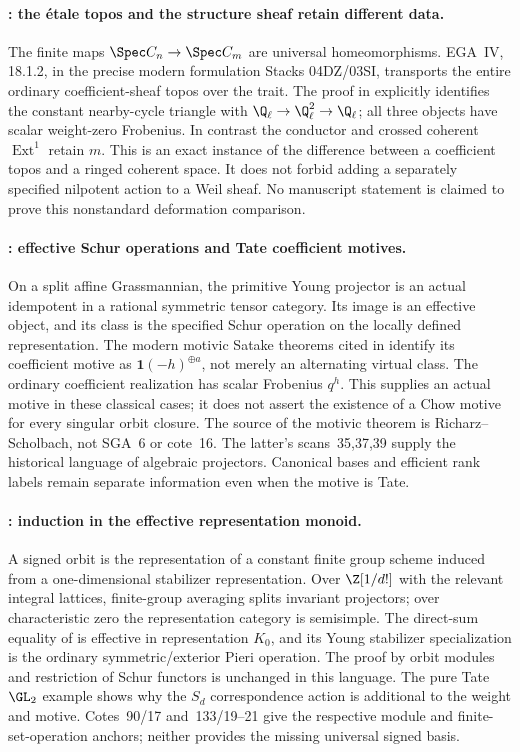 \paragraph{: the \'etale topos and the structure sheaf retain different data.}
The finite maps $\Spec C_n\to\Spec C_m$ are universal
homeomorphisms. EGA~IV, 18.1.2, in the precise modern formulation
Stacks 04DZ/03SI, transports the entire ordinary coefficient-sheaf
topos over the trait. The proof in  explicitly identifies
the constant nearby-cycle triangle with
$\Q_\ell\to\Q_\ell^2\to\Q_\ell$; all three objects have scalar
weight-zero Frobenius. In contrast the conductor and crossed coherent
$\operatorname{Ext}^1$ retain $m$. This is an exact instance of the
difference between a coefficient topos and a ringed coherent space.
It does not forbid adding a separately specified nilpotent action to
a Weil sheaf. No manuscript statement is claimed to prove this
nonstandard deformation comparison.

\paragraph{: effective Schur operations and Tate coefficient motives.}
On a split affine Grassmannian, the primitive Young projector is an
actual idempotent in a rational symmetric tensor category. Its image
is an effective object, and its class is the specified Schur operation
on the locally defined representation. The modern motivic Satake
theorems cited in  identify its coefficient motive as
$\mathbf1(-h)^{\oplus a}$, not merely an alternating virtual class.
The ordinary coefficient realization has scalar Frobenius $q^h$.
This supplies an actual motive in these classical cases; it does not
assert the existence of a Chow motive for every singular orbit closure.
The source of the motivic theorem is Richarz--Scholbach, not SGA~6
or cote~16. The latter's scans~35,37,39 supply the historical language
of algebraic projectors. Canonical bases and efficient rank labels
remain separate information even when the motive is Tate.

\paragraph{: induction in the effective representation monoid.}
A signed orbit is the representation of a constant finite group
scheme induced from a one-dimensional stabilizer representation.
Over $\Z[1/d!]$ with the relevant integral lattices, finite-group
averaging splits invariant projectors; over characteristic zero
the representation category is semisimple. The direct-sum equality
of  is effective in representation $K_0$, and its Young
stabilizer specialization is the ordinary symmetric/exterior Pieri
operation. The proof by orbit modules and restriction of Schur
functors is unchanged in this language. The pure Tate $\GL_2$
example shows why the $S_d$ correspondence action is additional to
the weight and motive. Cotes~90/17 and~133/19--21 give the respective
module and finite-set-operation anchors; neither provides the missing
universal signed basis.

